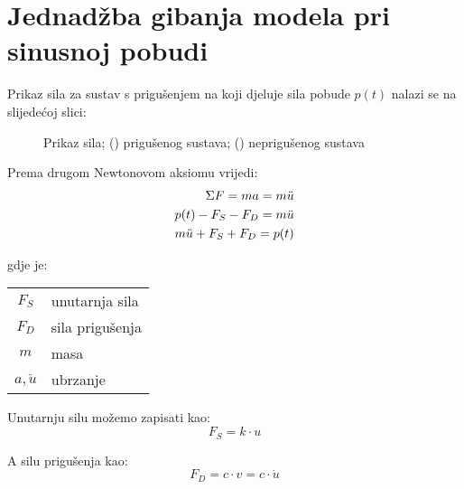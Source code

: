 \section{Jednadžba gibanja modela pri sinusnoj pobudi}
Prikaz sila za sustav s prigušenjem na koji djeluje sila pobude $p(t)$ nalazi se 
na slijedećoj slici:

\begin{figure}[H]
    \begin{subfigure}[c]{0.5\textwidth}
        \centering
        
        \caption{}
        \label{fig:sile-priguseni-ekvivalentni-sustav-sdf}
    \end{subfigure}
    \hfill
    \begin{subfigure}[c]{0.5\textwidth}
        \centering
        
        \caption{}
        \label{fig:sile-nepriguseni-ekvivalentni-sustav-sdf}
    \end{subfigure}
    \caption{Prikaz sila;
        ()
            prigušenog sustava; 
    ()
            neprigušenog sustava}
    \label{fig:dijagrami_sila}
\end{figure}


Prema drugom Newtonovom aksiomu vrijedi:
\begin{align}
    \Sigma F = ma = m\ddot{u}\notag\\
        p(t) - F_S - F_D = m\ddot{u} \notag\\
        m\ddot{u} + F_S + F_D = p(t) \label{eq:newton}
\end{align}

gdje je:\\
\begin{table}[H]
\begin{tabular}{c l}
	$F_S$ & unutarnja sila \\
	$F_D$ & sila prigušenja \\
	$m$   & masa \\
        $a,\ddot{u}$   & ubrzanje\\
\end{tabular}
\end{table}

Unutarnju silu možemo zapisati kao:
\begin{equation}
	F_S = k \cdot u \label{eq:hooke}
\end{equation}

A silu prigušenja kao:
\begin{equation}
	F_D = c \cdot v = c \cdot \dot{u} \label{eq:prigusenje}
\end{equation}

